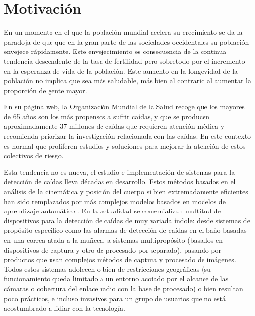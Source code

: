 \iffalse
Resumen esquemático de cada una de las partes del trabajo. Leer esta sección ha de dar una idea clara de lo que se pretendía y las conclusiones a las que se han llegado y del proceso seguido. Es uno de los capítulos mas importantes

Motivación:
Problema a tratar, posibles causas, relevancia del problema

Planteamiento:
¿cómo se puede resolver el problema qué se propone descripción de objetivos en términos generales?

Estructura:
qué hay en cada uno de los subsiguientes capítulos
\fi

\section{Motivación}\label{sec:intro:motivación}

En un momento en el que la población mundial acelera su crecimiento se da la paradoja de que que en la gran parte de las sociedades occidentales su población envejece rápidamente. Este envejecimiento es consecuencia de la continua tendencia descendente de la tasa de fertilidad pero sobretodo por el incremento en la esperanza de vida de la población. Este aumento en la longevidad de la población no implica que sea más saludable, más bien al contrario al aumentar la proporción de gente mayor.

En su página web, la Organización Mundial de la Salud recoge que los mayores de 65 años son los más propensos a sufrir caídas, y que se producen aproximadamente 37 millones de caídas que requieren atención médica y recomienda priorizar la investigación relacionada con las caídas\cite{FactsFalls2018}. En este contexto es normal que proliferen estudios y soluciones para mejorar la atención de estos colectivos de riesgo.

Esta tendencia no es nueva, el estudio e implementación de sistemas para la detección de caídas lleva décadas en desarrollo\cite{fallindex00, Chen2005, Noury2007, Bourke2006}. Estos métodos basados en el análisis de la cinemática y posición del cuerpo si bien extremadamente eficientes han sido remplazados por más complejos modelos basados en modelos de aprendizaje automático \cite{Ozdemir2014,Aziz2017b,Putra2017}. En la actualidad se comercializan multitud de dispositivos para la detección de caídas de muy variada índole: desde sistemas de propósito específico como las alarmas de detección de caídas en el baño basadas en una correa atada a la muñeca, a sistemas multipropósito (basados en dispositivos de captura y otro de procesado por separado), pasando por productos que usan complejos métodos de captura y procesado de imágenes. Todos estos sistemas adolecen o bien de restricciones geográficas (su funcionamiento queda limitado a un entorno acotado por el alcance de las cámaras o cobertura del enlace radio con la base de procesado) o bien resultan poco prácticos, e incluso invasivos para un grupo de usuarios que no está acostumbrado a lidiar con la tecnología.

